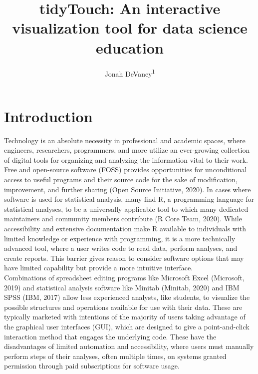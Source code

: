 \documentclass[english,man,floatsintext]{apa6}
\author{Jonah DeVaney\textsuperscript{1}}
\affiliation{
\vspace{0.5cm}
\textsuperscript{1} East Tennesse State University}
\title{tidyTouch: An interactive visualization tool for data science education}
\date{}
\begin{document}
\maketitle

\hypertarget{introduction}{%
\section{Introduction}\label{introduction}}

Technology is an absolute necessity in professional and academic spaces, where engineers, researchers, programmers, and more utilize an ever-growing collection of digital tools for organizing and analyzing the information vital to their work. Free and open-source software (FOSS) provides opportunities for unconditional access to useful programs and their source code for the sake of modification, improvement, and further sharing (Open Source Initiative, 2020). In cases where software is used for statistical analysis, many find R, a programming language for statistical analyses, to be a universally applicable tool to which many dedicated maintainers and community members contribute (R Core Team, 2020). While accessibility and extensive documentation make R available to individuals with limited knowledge or experience with programming, it is a more technically advanced tool, where a user writes code to read data, perform analyses, and create reports. This barrier gives reason to consider software options that may have limited capability but provide a more intuitive interface.\\
Combinations of spreadsheet editing programs like Microsoft Excel (Microsoft, 2019) and statistical analysis software like Minitab (Minitab, 2020) and IBM SPSS (IBM, 2017) allow less experienced analysts, like students, to visualize the possible structures and operations available for use with their data. These are typically marketed with intentions of the majority of users taking advantage of the graphical user interfaces (GUI), which are designed to give a point-and-click interaction method that engages the underlying code. These have the disadvantages of limited automation and accessibility, where users must manually perform steps of their analyses, often multiple times, on systems granted permission through paid subscriptions for software usage.\\
\end{document}
